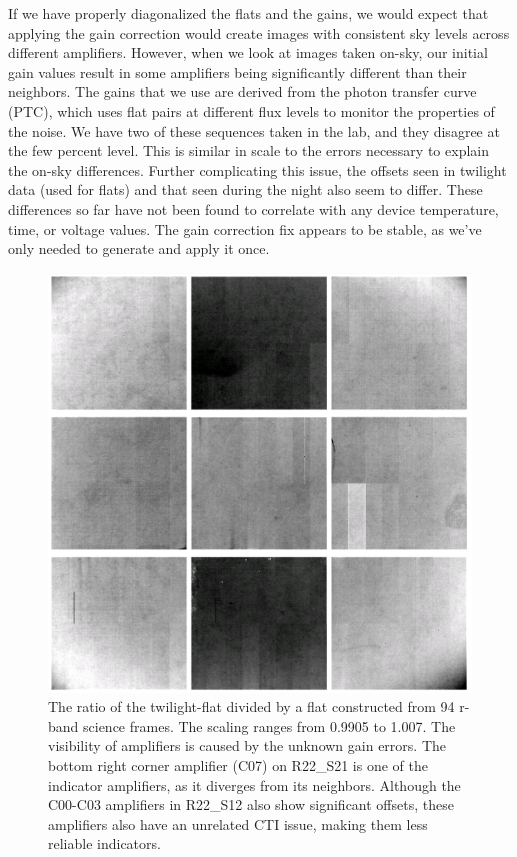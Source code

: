 If we have properly diagonalized the flats and the gains, we would expect that applying the gain correction would create images with consistent sky levels across different amplifiers.
However, when we look at images taken on-sky, our initial gain values result in some amplifiers being significantly different than their neighbors.
The gains that we use are derived from the photon transfer curve (PTC), which uses flat pairs at different flux levels to monitor the properties of the noise.
We have two of these sequences taken in the lab, and they disagree at the few percent level.
This is similar in scale to the errors necessary to explain the on-sky differences.
Further complicating this issue, the offsets seen in twilight data (used for flats) and that seen during the night also seem to differ.
These differences so far have not been found to correlate with any device temperature, time, or voltage values.
The gain correction fix appears to be stable, as we've only needed to generate and apply it once.

\begin{figure}
  \includegraphics{figures/isr-f06-twilight_flat_ratio.png}
  \caption{The ratio of the twilight-flat divided by a flat constructed from 94 r-band science frames.  The scaling ranges from 0.9905 to 1.007.  The visibility of amplifiers is caused by the unknown gain errors.  The bottom right corner amplifier (C07) on R22_S21 is one of the indicator amplifiers, as it diverges from its neighbors.  Although the C00-C03 amplifiers in R22_S12 also show significant offsets, these amplifiers also have an unrelated CTI issue, making them less reliable indicators.}
\end{figure}

